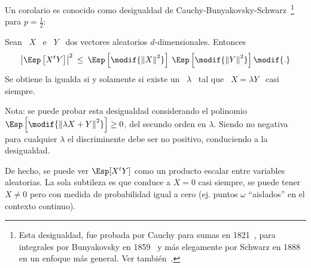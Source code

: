 Un       corolario       es       conocido       como       desigualdad       de
Cauchy-Bunyakovsky-Schwarz~\footnote{Esta  desigualdad, fue  probada  por Cauchy
  para  sumas   en  1821~\cite{Cau21},   para  integrales  por   Bunyakovsky  en
  1859~\cite{Bou59} y  m\'as elegamente por  Schwarz en 1888~\cite{Sch88}  en un
  enfoque m\'as general. Ver tambi\'en~\cite{Ste04}.} para $p = \frac12$:
%
\begin{corolario}
\label{Cor:MP:DesigualdadCauchySchwarz}
%
  Sean \  $X$ \ e \  $Y$ \ dos vectores  aleatorios $d$-dimensionales. Entonces
  \[
  \left|  \Esp\left[  X^t Y  \right]  \right|^2 \:  \le  \:  \Esp\left[ \modif{\left\|  X
    \right\|^2}   \right]  \:  \Esp\left[   \modif{\left\|  Y
    \right\|^2} \right]\modif{.}
  \]
  Se obtiene la igualda si y solamente si existe un \ $\lambda$ \ tal que \ $X =
  \lambda Y$ \ casi siempre.
\end{corolario}
%
Nota:  se puede probar  esta desigualdad  considerando el  polinomio $\Esp\left[
  \modif{\left\| \lambda X + Y \right\|^2}  \right] \ge 0$, del secundo orden en
$\lambda$. Siendo no negativa para cualquier $\lambda$ el discriminente debe ser
no positivo, conduciendo a la desigualdad.


De hecho,  se puede ver $\Esp[X^t  Y]$ como un producto  escalar entre variables
aleatorias. La sola subtileza es que  
conduce a $X = 0$ casi siempre, \ie  se puede tener $X \ne 0$ pero con medida de
probabilidad  igual a  cero (ej.  puntos  $\omega$ ``aislados''  en el  contexto
continuo).



